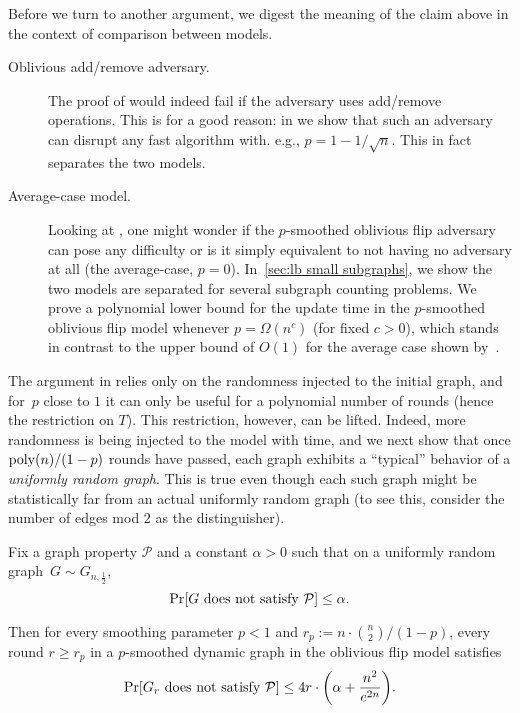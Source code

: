 \documentclass[letter,11pt]{article}
\begin{document}
Before we turn to another argument, we digest the meaning of the claim above in the context of comparison between models.
\begin{description}
    \item[Oblivious add/remove adversary.] 
    The proof of  would indeed fail if the adversary uses add/remove operations. This is for a good reason: in  we show that such an adversary can disrupt any fast algorithm with. e.g., $p = 1 - 1/\sqrt{n}$. 
    This in fact separates the two models.
    

    \item[Average-case model.] 
    Looking at , one might wonder if the $p$-smoothed oblivious flip adversary can pose any difficulty or is it simply equivalent to not having no adversary at all (the average-case, $p=0$).
    In~\cref{sec:lb small subgraphs}, we show the two models are separated for several subgraph counting problems. We prove a polynomial lower bound for the update time in the $p$-smoothed oblivious flip model whenever $p = \Omega(n^{c})$ (for fixed $c> 0$), which stands in contrast to the upper bound of $O(1)$ for the average case shown by~\cite{HLS22}.
\end{description}




The argument in  relies only on the randomness injected to the initial graph, and for~$p$ close to $1$ it can only be useful for a polynomial number of rounds (hence the restriction on $T$).
This restriction, however, can be lifted. Indeed, more randomness is being injected to the model with time, and we next show that once $\operatorname{poly}(n)/(1-p)$ rounds have passed, each graph exhibits a ``typical'' behavior of a \emph{uniformly random graph}.
This is true even though each such graph might be statistically far from an actual uniformly random graph (to see this, consider the number of edges mod $2$ as the distinguisher). 

\begin{claim}
    \label{claim:oblivious_flip_looks_random}
    Fix a graph property $\mathcal{P}$ and a constant $\alpha>0$ such that on a uniformly random graph~$G \sim G_{n,\frac{1}{2}}$,
    \[
        \Prob{}{G \textnormal{ does not satisfy } \mathcal{P}} \leq \alpha .
    \]
    Then for every smoothing parameter $p < 1$ and $r_p := n\cdot \binom{n}{2} / (1-p)$, every round $r \geq r_p$ in a $p$-smoothed dynamic graph in the oblivious flip model satisfies
    \[
        \Prob{}{G_r \textnormal{ does not satisfy }\mathcal{P}} \leq 4r\cdot \left(\alpha + \frac{n^2}{e^{2n}}\right) .
    \]
\end{claim}
\end{document}
